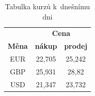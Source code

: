 \documentclass[11pt, a4paper]{article}
\begin{document}
\begin{table}[ht]
    \centering
    \shorthandoff{-}
    \begin{tabular}{| c | c | c |} \hline
                      & \multicolumn{2}{|c|}{\textbf{Cena}}                   \\ \cline{2-3}
        \textbf{Měna} & \textbf{nákup}                      & \textbf{prodej} \\ \hline
        EUR           & 22,705                              & 25,242          \\ \hline
        GBP           & 25,931                              & 28,82           \\ \hline
        USD           & 21,347                              & 23,732          \\ \hline
    \end{tabular}
    \caption{Tabulka kurzů k~dnešnímu dni}
    \shorthandon{-}
\end{table}
\end{document}
